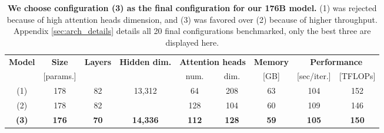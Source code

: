 \begin{table*}[t]
\begin{small}
\begin{center}
\begin{tabular}{ccccccccc}
\toprule
\multicolumn{1}{c}{\textbf{Model}} & \textbf{Size} & \textbf{Layers} & \textbf{Hidden dim.}    & \multicolumn{2}{c}{\textbf{Attention heads}} & \multicolumn{1}{c}{\textbf{Memory}} & \multicolumn{2}{c}{\textbf{Performance}}                       \\
\multicolumn{1}{c}{}               & [params.]     &                 &                         & num.                  & dim.                 & \multicolumn{1}{c}{[GB]}            & \multicolumn{1}{c}{[sec/iter.]} & \multicolumn{1}{c}{[TFLOPs]} \\ \midrule
(1)                                & 178           & 82              & \multirow{2}{*}{13,312} & 64                    & 208                  & 63                                  & 104                             & 152                          \\
(2)                                & 178           & 82              &                         & 128                   & 104                  & 60                                  & 109                             & 146                          \\
\textbf{(3)}                                & \textbf{176}           & \textbf{70}              & \textbf{14,336}                  & \textbf{112}                   & \textbf{128}                  & \textbf{59}                                  & \textbf{105}                             & \textbf{150}                          \\ \bottomrule
\end{tabular}
\end{center}
\end{small}
\caption{\textbf{We choose configuration (3) as the final configuration for our 176B model.} (1) was rejected because of high attention heads dimension, and (3) was favored over (2) because of higher throughput. Appendix \ref{sec:arch_details} details all 20 final configurations benchmarked, only the best three are displayed here.}\label{tab:final_configs}
\end{table*}



